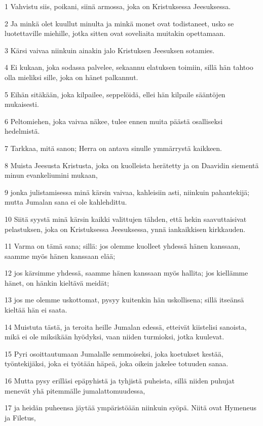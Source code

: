 \par 1 Vahvistu siis, poikani, siinä armossa, joka on Kristuksessa Jeesuksessa.
\par 2 Ja minkä olet kuullut minulta ja minkä monet ovat todistaneet, usko se luotettaville miehille, jotka sitten ovat soveliaita muitakin opettamaan.
\par 3 Kärsi vaivaa niinkuin ainakin jalo Kristuksen Jeesuksen sotamies.
\par 4 Ei kukaan, joka sodassa palvelee, sekaannu elatuksen toimiin, sillä hän tahtoo olla mieliksi sille, joka on hänet palkannut.
\par 5 Eihän sitäkään, joka kilpailee, seppelöidä, ellei hän kilpaile sääntöjen mukaisesti.
\par 6 Peltomiehen, joka vaivaa näkee, tulee ennen muita päästä osalliseksi hedelmistä.
\par 7 Tarkkaa, mitä sanon; Herra on antava sinulle ymmärrystä kaikkeen.
\par 8 Muista Jeesusta Kristusta, joka on kuolleista herätetty ja on Daavidin siementä minun evankeliumini mukaan,
\par 9 jonka julistamisessa minä kärsin vaivaa, kahleisiin asti, niinkuin pahantekijä; mutta Jumalan sana ei ole kahlehdittu.
\par 10 Siitä syystä minä kärsin kaikki valittujen tähden, että hekin saavuttaisivat pelastuksen, joka on Kristuksessa Jeesuksessa, ynnä iankaikkisen kirkkauden.
\par 11 Varma on tämä sana; sillä: jos olemme kuolleet yhdessä hänen kanssaan, saamme myös hänen kanssaan elää;
\par 12 jos kärsimme yhdessä, saamme hänen kanssaan myös hallita; jos kiellämme hänet, on hänkin kieltävä meidät;
\par 13 jos me olemme uskottomat, pysyy kuitenkin hän uskollisena; sillä itseänsä kieltää hän ei saata.
\par 14 Muistuta tästä, ja teroita heille Jumalan edessä, etteivät kiistelisi sanoista, mikä ei ole miksikään hyödyksi, vaan niiden turmioksi, jotka kuulevat.
\par 15 Pyri osoittautumaan Jumalalle semmoiseksi, joka koetukset kestää, työntekijäksi, joka ei työtään häpeä, joka oikein jakelee totuuden sanaa.
\par 16 Mutta pysy erilläsi epäpyhistä ja tyhjistä puheista, sillä niiden puhujat menevät yhä pitemmälle jumalattomuudessa,
\par 17 ja heidän puheensa jäytää ympäristöään niinkuin syöpä. Niitä ovat Hymeneus ja Filetus,
